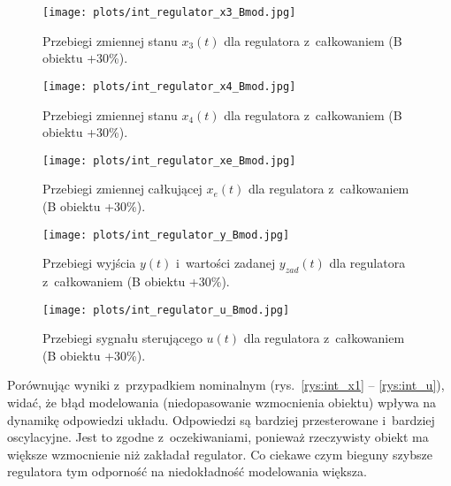\documentclass[a4paper,titlepage,11pt,floatssmall]{mwrep} %
\begin{document}
\begin{figure}[H]
    \centering
    \texttt{[image: plots/int\_regulator\_x3\_Bmod.jpg]}
    \caption{Przebiegi zmiennej stanu $x_3(t)$ dla regulatora z~całkowaniem (B obiektu +30\%).}
    \label{rys:int_bmod_x3}
\end{figure}

\begin{figure}[H]
    \centering
    \texttt{[image: plots/int\_regulator\_x4\_Bmod.jpg]}
    \caption{Przebiegi zmiennej stanu $x_4(t)$ dla regulatora z~całkowaniem (B obiektu +30\%).}
    \label{rys:int_bmod_x4}
\end{figure}

\begin{figure}[H]
    \centering
    \texttt{[image: plots/int\_regulator\_xe\_Bmod.jpg]}
    \caption{Przebiegi zmiennej całkującej $x_e(t)$ dla regulatora z~całkowaniem (B obiektu +30\%).}
    \label{rys:int_bmod_xe}
\end{figure}

\begin{figure}[H]
    \centering
    \texttt{[image: plots/int\_regulator\_y\_Bmod.jpg]}
    \caption{Przebiegi wyjścia $y(t)$ i~wartości zadanej $y_{zad}(t)$ dla regulatora z~całkowaniem (B obiektu +30\%).}
    \label{rys:int_bmod_y}
\end{figure}

\begin{figure}[H]
    \centering
    \texttt{[image: plots/int\_regulator\_u\_Bmod.jpg]}
    \caption{Przebiegi sygnału sterującego $u(t)$ dla regulatora z~całkowaniem (B obiektu +30\%).}
    \label{rys:int_bmod_u}
\end{figure}

Porównując wyniki z~przypadkiem nominalnym (rys.~\ref{rys:int_x1} -- \ref{rys:int_u}), widać, że błąd modelowania (niedopasowanie wzmocnienia obiektu) wpływa na dynamikę odpowiedzi układu. Odpowiedzi są bardziej przesterowane i~bardziej oscylacyjne. Jest to zgodne z~oczekiwaniami, ponieważ rzeczywisty obiekt ma większe wzmocnienie niż zakładał regulator. Co ciekawe czym bieguny szybsze regulatora tym odporność na niedokładność modelowania większa.

\end{document}
